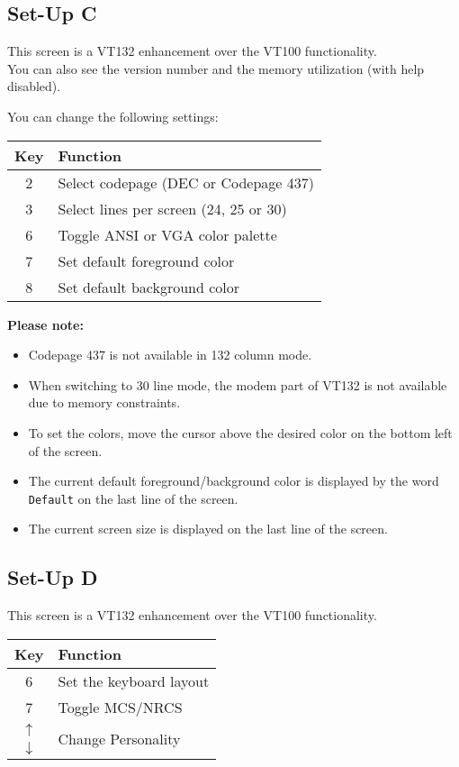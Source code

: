 \subsection{Set-Up C}

This screen is a VT132 enhancement over the VT100 functionality. \\
You can also see the version number and the memory utilization (with help disabled).

You can change the following settings:

\begin{tabular}{ c | p{}}
\hline
\textbf{Key} & \textbf{Function} \\
\hline
2   & Select codepage (DEC or Codepage 437) \\
3   & Select lines per screen (24, 25 or 30) \\
6   & Toggle ANSI or VGA color palette \\
7   & Set default foreground color \\
8   & Set default background color \\
\hline
\end{tabular}

\textbf{Please note:}
\begin{itemize}
 \item Codepage 437 is not available in 132 column mode.
 \item When switching to 30 line mode, the modem part of VT132 is not available due to memory constraints.
 \item To set the colors, move the cursor above the desired color on the bottom left of the screen.
 \item The current default foreground/background color is displayed by the word \texttt{Default} on the last line of the screen.
 \item The current screen size is displayed on the last line of the screen.
\end{itemize}

\subsection{Set-Up D}

This screen is a VT132 enhancement over the VT100 functionality.

\begin{tabular}{ c | p{}}
\hline
\textbf{Key} & \textbf{Function} \\
\hline
6   & Set the keyboard layout \\
7   & Toggle MCS/NRCS \\
\hline
\texttt{$\uparrow$}     & \multirow{2}{*}{Change Personality} \\
\texttt{$\downarrow$}   & \\
\hline
\end{tabular}

